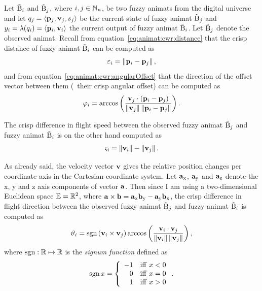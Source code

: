 Let ${\tilde{\mathrm{B}}}_i$ and ${\tilde{\mathrm{B}}}_j$, where $i, j \in \mathbb{N}_n$, be two fuzzy animats from the digital universe and let $q_j=\langle {\ensuremath{\mathbf{p}}}_j, {\mathbf{v}}_j, s_j \rangle$ be the current state of fuzzy animat ${\tilde{\mathrm{B}}}_j$ and $y_i=\lambda(q_i)=\langle {\ensuremath{\mathbf{p}}}_i, {\mathbf{v}}_i \rangle$ the current output of fuzzy animat ${\tilde{\mathrm{B}}}_i$. Let ${\tilde{\mathrm{B}}}_j$ denote the observed animat. Recall from equation~\eqref{eq:animat:cwr:distance} that the crisp distance of fuzzy animat ${\tilde{\mathrm{B}}}_i$ can be computed as
%
\begin{equation}
\varepsilon_i%
 =\left\|\vect{p}_i - \vect{p}_j\right\|,
\end{equation}
%
and from equation~\eqref{eq:animat:cwr:angularOffset} that the direction of the offset vector between them (\ie\ their crisp angular offset) can be computed as
%
\begin{equation}
\varphi_i%
 =\arccos \left( \frac {\vect{v}_j \cdot (\vect{p}_i - \vect{p}_j)}{\left\| \vect{v}_j \right\| \left\| \vect{p}_i - \vect{p}_j \right\|} \right). 
\end{equation}

The crisp difference in flight speed between the observed fuzzy animat ${\tilde{\mathrm{B}}}_j$ and fuzzy animat ${\tilde{\mathrm{B}}}_i$ is on the other hand computed as 
%
\begin{equation}
\varsigma_i%
 =\left\|\vect{v}_i\right\| - \left\|\vect{v}_j\right\|.
\end{equation}

As already said, the velocity vector ${\mathbf{v}}$ gives the relative position changes per coordinate axis in the Cartesian coordinate system. Let ${\mathbf{a}}_\mathrm{x}$, ${\mathbf{a}}_\mathrm{y}$ and ${\mathbf{a}}_\mathrm{z}$ denote the $\mathrm{x}$, $\mathrm{y}$ and $\mathrm{z}$ axis components of vector ${\mathbf{a}}$. Then since I am using a two-dimensional Euclidean space $\mathbb{E}=\mathbb{R}^2$, where ${\mathbf{a}} \times {\ensuremath{\mathbf{b}}} = {\mathbf{a}}_\mathrm{x}{\mathbf{b}}_\mathrm{y} - {\mathbf{a}}_\mathrm{y}{\mathbf{b}}_\mathrm{x}$, the crisp difference in flight direction between the observed fuzzy animat ${\tilde{\mathrm{B}}}_j$ and fuzzy animat ${\tilde{\mathrm{B}}}_i$ is computed as
%
\begin{equation}
\vartheta_i%
 =\sgn\left(\vect{v}_i \times \vect{v}_j\right)\arccos \left( \frac {\vect{v}_i \cdot \vect{v}_j}{\left\| \vect{v}_i \right\| \left\| \vect{v}_j \right\|} \right),
\end{equation}
%
where $\operatorname*{sgn}: \mathbb{R} \mapsto \mathbb{R}$ is the \emph{signum function} defined as 
\begin{equation}
\operatorname*{sgn} x=\left\{
\begin{array}{rl}
-1 & \mathrm{iff}\ x < 0\\
0 & \mathrm{iff}\ x = 0\\
1 & \mathrm{iff}\ x > 0
\end{array}
\right..
\end{equation}

